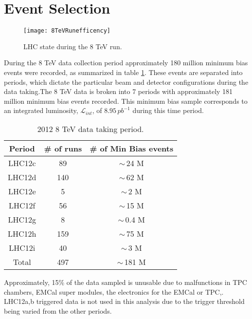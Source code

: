 \section{Event Selection}


\begin{figure}[h]
\texttt{[image: 8TeVRunefficency]}
\centering
\caption{LHC state during the 8 TeV run. }
\label{fig:RunEff}
\end{figure}

During the 8 TeV data collection period approximately 180 million minimum bias events were recorded, as summarized in table \ref{tab:RunSummary}.  These events are separated into periods, which dictate the particular beam and detector configurations during the data taking.The 8 TeV data is broken into 7 periods with approximately 181 million minimum bias events recorded.  This minimum bias sample corresponds to an integrated luminosity, $\mathscr{L}_{int}$, of $8.95 \, pb^{-1}$ during this time period\cite{ALICE-PUBLIC-2017-002}.

\begin{table}[hb]
\label{tab:RunSummary}
\begin{center}
\begin{tabular}[b]{|c|c|c|}
	\hline
	Period & \# of runs & \# of Min Bias events \\ \hline
	LHC12c & 89 & $\sim \,$24 M \\ \hline
	LHC12d & 140 & $\sim \,$62 M \\ \hline
	LHC12e & 5 & $\sim \,$2 M \\ \hline
	LHC12f & 56 & $\sim \,$15 M \\ \hline
	LHC12g & 8 & $\sim \,$0.4 M \\ \hline
	LHC12h & 159 & $\sim \,$75 M \\ \hline
	LHC12i & 40 & $\sim \,$3 M \\ \hline
	Total & 497 & $\sim \,$181 M \\ \hline

\end{tabular}
\end{center}
\caption{2012 8 TeV data taking period.}
\end{table}

Approximately, 15\% of the data sampled is unusable due to malfunctions in TPC chambers, EMCal super modules, the electronics for the EMCal or TPC,.  LHC12a,b triggered data is not used in this analysis due to the trigger threshold being varied from the other periods.  

